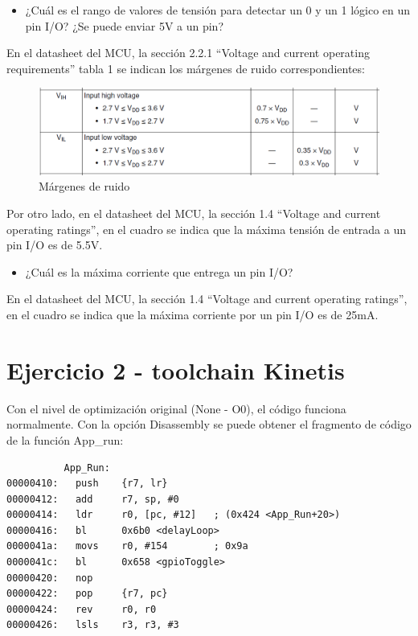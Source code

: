 \documentclass{article}
\begin{document}
\begin{itemize}
\item ¿Cuál es el rango de valores de tensión para detectar un 0 y un 1 lógico en un pin I/O? ¿Se puede enviar 5V a un pin?
\end{itemize}
En el datasheet del MCU, la sección 2.2.1 ``Voltage and current operating requirements'' tabla 1 se indican los márgenes de ruido correspondientes:

\begin{figure}[ht]
	\centering
	\includegraphics[width=0.8 \textwidth]
	{../Imagenes/TablaMargenes.png}
	\caption{Márgenes de ruido}
	\label{fig:ej1}
\end{figure}

Por otro lado, en el datasheet del MCU, la sección 1.4 ``Voltage and current operating ratings'', en el cuadro se indica que la máxima tensión de entrada a un pin I/O es de 5.5V.

\begin{itemize}
\item ¿Cuál es la máxima corriente que entrega un pin I/O?
\end{itemize}
En el datasheet del MCU, la sección 1.4 ``Voltage and current operating ratings'', en el cuadro se indica que la máxima corriente por un pin I/O es de 25mA.

\newpage

\section*{Ejercicio 2 - toolchain Kinetis}

Con el nivel de optimización original (None - O0), el código funciona normalmente. Con la opción Disassembly se puede obtener el fragmento de código de la función App\_run:

\begin{lstlisting}
          App_Run:
00000410:   push    {r7, lr}
00000412:   add     r7, sp, #0
00000414:   ldr     r0, [pc, #12]   ; (0x424 <App_Run+20>)
00000416:   bl      0x6b0 <delayLoop>
0000041a:   movs    r0, #154        ; 0x9a
0000041c:   bl      0x658 <gpioToggle>
00000420:   nop     
00000422:   pop     {r7, pc}
00000424:   rev     r0, r0
00000426:   lsls    r3, r3, #3
\end{lstlisting}
\end{document}
